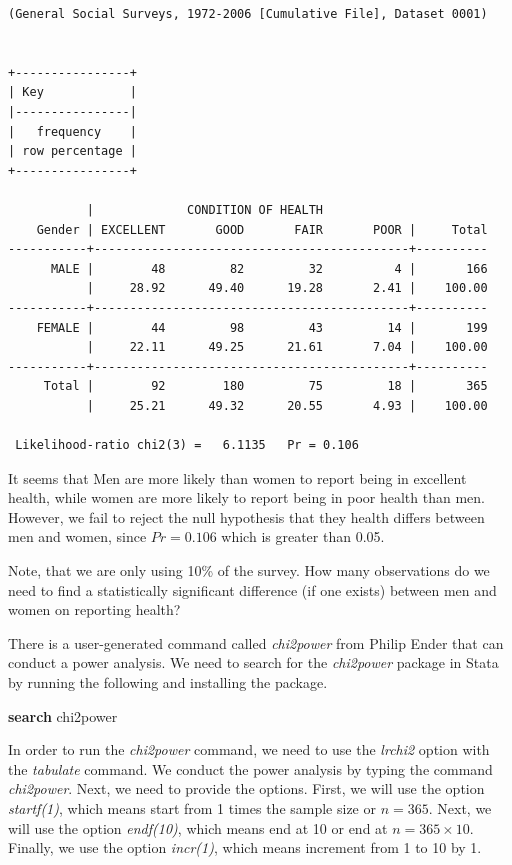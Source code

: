 \documentclass[
]{book}
\newenvironment{Shaded}{\begin{snugshade}}{\end{snugshade}}
\newcommand{\KeywordTok}[1]{\textcolor[rgb]{0.13,0.29,0.53}{\textbf{#1}}}
\newcommand{\NormalTok}[1]{#1}
\begin{document}
\begin{verbatim}
(General Social Surveys, 1972-2006 [Cumulative File], Dataset 0001)


+----------------+
| Key            |
|----------------|
|   frequency    |
| row percentage |
+----------------+

           |             CONDITION OF HEALTH
    Gender | EXCELLENT       GOOD       FAIR       POOR |     Total
-----------+--------------------------------------------+----------
      MALE |        48         82         32          4 |       166 
           |     28.92      49.40      19.28       2.41 |    100.00 
-----------+--------------------------------------------+----------
    FEMALE |        44         98         43         14 |       199 
           |     22.11      49.25      21.61       7.04 |    100.00 
-----------+--------------------------------------------+----------
     Total |        92        180         75         18 |       365 
           |     25.21      49.32      20.55       4.93 |    100.00 

 Likelihood-ratio chi2(3) =   6.1135   Pr = 0.106
\end{verbatim}

It seems that Men are more likely than women to report being in excellent health, while women are more likely to report being in poor health than men. However, we fail to reject the null hypothesis that they health differs between men and women, since \(Pr=0.106\) which is greater than 0.05.

Note, that we are only using 10\% of the survey. How many observations do we need to find a statistically significant difference (if one exists) between men and women on reporting health?

There is a user-generated command called \emph{chi2power} from Philip Ender that can conduct a power analysis. We need to search for the \emph{chi2power} package in Stata by running the following and installing the package.

\begin{Shaded}
\begin{Highlighting}[]
\KeywordTok{search}\NormalTok{ chi2power}
\end{Highlighting}
\end{Shaded}

In order to run the \emph{chi2power} command, we need to use the \emph{lrchi2} option with the \emph{tabulate} command. We conduct the power analysis by typing the command \emph{chi2power}. Next, we need to provide the options. First, we will use the option \emph{startf(1)}, which means start from 1 times the sample size or \(n=365\). Next, we will use the option \emph{endf(10)}, which means end at 10 or end at \(n=365 \times 10\). Finally, we use the option \emph{incr(1)}, which means increment from 1 to 10 by 1.
\end{document}
